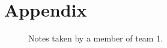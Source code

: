 \documentclass[sigplan,10pt]{acmart}
\begin{document}
\appendix
\section{Appendix}

\begin{figure}
    \caption{Notes taken by a member of team 1.}
    \label{fig:notes1}
\end{figure}
\end{document}
